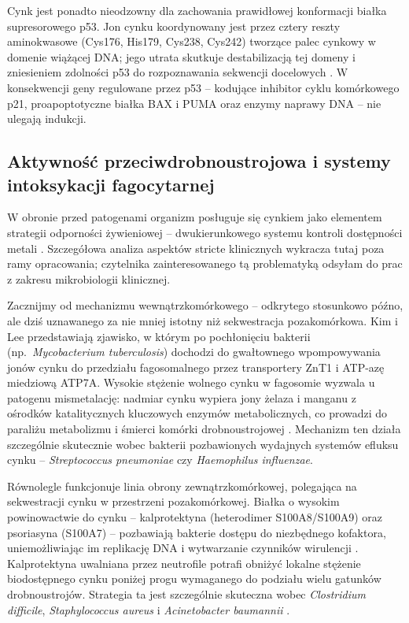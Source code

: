 \documentclass[12pt,a4paper]{article}
\begin{document}
Cynk jest ponadto nieodzowny dla zachowania prawidłowej konformacji białka supresorowego p53. Jon cynku koordynowany jest przez cztery reszty aminokwasowe (Cys176, His179, Cys238, Cys242) tworzące palec cynkowy w domenie wiążącej DNA; jego utrata skutkuje destabilizacją tej domeny i zniesieniem zdolności p53 do rozpoznawania sekwencji docelowych \cite{chasapis2020}. W konsekwencji geny regulowane przez p53 -- kodujące inhibitor cyklu komórkowego p21, proapoptotyczne białka BAX i PUMA oraz enzymy naprawy DNA -- nie ulegają indukcji.

\subsection{Aktywność przeciwdrobnoustrojowa i systemy intoksykacji fagocytarnej}

W obronie przed patogenami organizm posługuje się cynkiem jako elementem strategii odporności żywieniowej -- dwukierunkowego systemu kontroli dostępności metali \cite{wessels2017}. Szczegółowa analiza aspektów stricte klinicznych wykracza tutaj poza ramy opracowania; czytelnika zainteresowanego tą problematyką odsyłam do prac z zakresu mikrobiologii klinicznej.

Zacznijmy od mechanizmu wewnątrzkomórkowego -- odkrytego stosunkowo późno, ale dziś uznawanego za nie mniej istotny niż sekwestracja pozakomórkowa. Kim i Lee \cite{kimlee2021} przedstawiają zjawisko, w którym po pochłonięciu bakterii (np.\ \textit{Mycobacterium tuberculosis}) dochodzi do gwałtownego wpompowywania jonów cynku do przedziału fagosomalnego przez transportery ZnT1 i ATP-azę miedziową ATP7A. Wysokie stężenie wolnego cynku w fagosomie wyzwala u patogenu mismetalację: nadmiar cynku wypiera jony żelaza i manganu z ośrodków katalitycznych kluczowych enzymów metabolicznych, co prowadzi do paraliżu metabolizmu i śmierci komórki drobnoustrojowej \cite{kimlee2021}. Mechanizm ten działa szczególnie skutecznie wobec bakterii pozbawionych wydajnych systemów efluksu cynku -- \textit{Streptococcus pneumoniae} czy \textit{Haemophilus influenzae}.

Równolegle funkcjonuje linia obrony zewnątrzkomórkowej, polegająca na sekwestracji cynku w przestrzeni pozakomórkowej. Białka o wysokim powinowactwie do cynku -- kalprotektyna (heterodimer S100A8/S100A9) oraz psoriasyna (S100A7) -- pozbawiają bakterie dostępu do niezbędnego kofaktora, uniemożliwiając im replikację DNA i wytwarzanie czynników wirulencji \cite{wessels2017}. Kalprotektyna uwalniana przez neutrofile potrafi obniżyć lokalne stężenie biodostępnego cynku poniżej progu wymaganego do podziału wielu gatunków drobnoustrojów. Strategia ta jest szczególnie skuteczna wobec \textit{Clostridium difficile}, \textit{Staphylococcus aureus} i \textit{Acinetobacter baumannii} \cite{wessels2017}.
\end{document}
